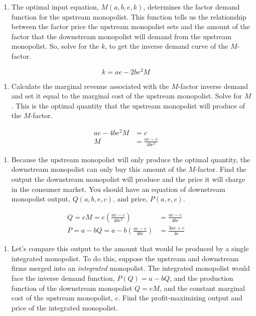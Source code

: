 \documentclass[
]{article}
\providecommand{\tightlist}{%
  \setlength{\itemsep}{0pt}\setlength{\parskip}{0pt}}\usepackage{longtable,booktabs,array}
\begin{document}
\begin{enumerate}
\def\labelenumi{\alph{enumi}.}
\setcounter{enumi}{2}
\tightlist
\item
  The optimal input equation, \(M(a,b,e,k)\), determines the factor
  demand function for the upstream monopolist. This function tells us
  the relationship between the factor price the upstream monopolist sets
  and the amount of the factor that the downstream monopolist will
  demand from the upstream monopolist. So, solve for the \(k\), to get
  the inverse demand curve of the \(M\)-factor.
\end{enumerate}

\[
k=ae-2be^2M
\]

\begin{enumerate}
\def\labelenumi{\alph{enumi}.}
\setcounter{enumi}{3}
\tightlist
\item
  Calculate the marginal revenue associated with the \(M\)-factor
  inverse demand and set it equal to the marginal cost of the upstream
  monopolist. Solve for \(M\). This is the optimal quantity that the
  upstream monopolist will produce of the \(M\)-factor.
\end{enumerate}

\[
\begin{aligned}
    ae-4be^2M &= c \\
    M &= \frac{ae-c}{4be^2}
\end{aligned}
\]

\begin{enumerate}
\def\labelenumi{\alph{enumi}.}
\setcounter{enumi}{4}
\tightlist
\item
  Because the upstream monopolist will only produce the optimal
  quantity, the downstream monopolist can only buy this amount of the
  \(M\)-factor. Find the output the downstream monopolist will produce
  and the price it will charge in the consumer market. You should have
  an equation of downstream monopolist output, \(Q(a,b,e,c)\), and
  price, \(P(a,e,c)\).
\end{enumerate}

\[
\begin{aligned}
    Q=eM=e\left(\frac{ae-c}{4be^2}\right)&=\frac{ae-c}{4be} \\
    P=a-bQ=a-b\left(\frac{ae-c}{4be}\right)&=\frac{3ae+c}{4e}
\end{aligned}
\]

\begin{enumerate}
\def\labelenumi{\alph{enumi}.}
\setcounter{enumi}{5}
\tightlist
\item
  Let's compare this output to the amount that would be produced by a
  single integrated monopolist. To do this, suppose the upstream and
  downstream firms merged into an \emph{integrated} monopolist. The
  integrated monopolist would face the inverse demand function,
  \(P(Q)=a-bQ\), and the production function of the downstream
  monopolist \(Q=eM\), and the constant marginal cost of the upstream
  monopolist, \(c\). Find the profit-maximizing output and price of the
  integrated monopolist.
\end{enumerate}
\end{document}
